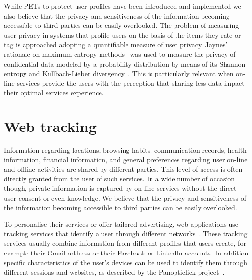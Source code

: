While PETs to protect user profiles have been introduced and implemented we also believe that the privacy and sensitiveness of the information becoming accessible to third parties can be easily overlooked. The problem of measuring user privacy in systems that profile users on the basis of the items they rate or tag is approached adopting a quantifiable measure of user privacy. Jaynes’ rationale on maximum entropy methods~\cite{jaynes1957information,jaynes1982rationale} was used to measure the privacy of confidential data modeled by a probability distribution by means of its Shannon entropy and Kullbach-Lieber divergency~\cite{rodriguez2015entropy, parra2014measuring}. This is particularly relevant when on-line services provide the users with the perception that sharing less data impact their optimal services experience. 

\section{Web tracking}

Information regarding locations, browsing habits, communication records, health information, financial information, and general preferences regarding user on-line and offline activities are shared by different parties. This level of access is often directly granted from the user of such services. In a wide number of occasion though, private information is captured by on-line services without the direct user consent or even knowledge. We believe that the privacy and sensitiveness of the information becoming accessible to third parties can be easily overlooked. 

To personalise their services or offer tailored advertising, web applications use tracking services that identify a user through different networks~\cite{veeningen2014line,getoor2012entity}. These tracking services usually combine information from different profiles that users create, for example their Gmail address or their Facebook or LinkedIn accounts. In addition specific characteristics of the user's devices can be used to identify them through different sessions and websites, as described by the Panopticlick project~\cite{eckersley2010unique}.

